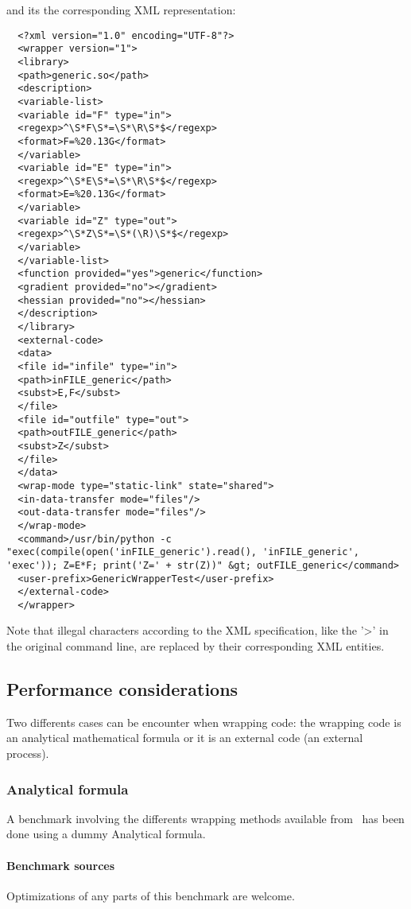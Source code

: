 and its the corresponding XML representation:
\begin{lstlisting}
  <?xml version="1.0" encoding="UTF-8"?>
  <wrapper version="1">
  <library>
  <path>generic.so</path>
  <description>
  <variable-list>
  <variable id="F" type="in">
  <regexp>^\S*F\S*=\S*\R\S*$</regexp>
  <format>F=%20.13G</format>
  </variable>
  <variable id="E" type="in">
  <regexp>^\S*E\S*=\S*\R\S*$</regexp>
  <format>E=%20.13G</format>
  </variable>
  <variable id="Z" type="out">
  <regexp>^\S*Z\S*=\S*(\R)\S*$</regexp>
  </variable>
  </variable-list>
  <function provided="yes">generic</function>
  <gradient provided="no"></gradient>
  <hessian provided="no"></hessian>
  </description>
  </library>
  <external-code>
  <data>
  <file id="infile" type="in">
  <path>inFILE_generic</path>
  <subst>E,F</subst>
  </file>
  <file id="outfile" type="out">
  <path>outFILE_generic</path>
  <subst>Z</subst>
  </file>
  </data>
  <wrap-mode type="static-link" state="shared">
  <in-data-transfer mode="files"/>
  <out-data-transfer mode="files"/>
  </wrap-mode>
  <command>/usr/bin/python -c "exec(compile(open('inFILE_generic').read(), 'inFILE_generic', 'exec')); Z=E*F; print('Z=' + str(Z))" &gt; outFILE_generic</command>
  <user-prefix>GenericWrapperTest</user-prefix>
  </external-code>
  </wrapper>
\end{lstlisting}
Note that illegal characters according to the XML specification, like the '\textgreater' in the original command line, are replaced by their corresponding XML entities.


\subsection{Performance considerations\label{speedo}}

Two differents cases can be encounter when wrapping code: the wrapping code is an analytical mathematical formula or it is an external code (an external process).

\subsubsection{Analytical formula}

A benchmark involving the differents wrapping methods available from \OT\ has been done using a dummy Analytical formula.


\paragraph{Benchmark sources} Optimizations of any parts of this benchmark are welcome.

